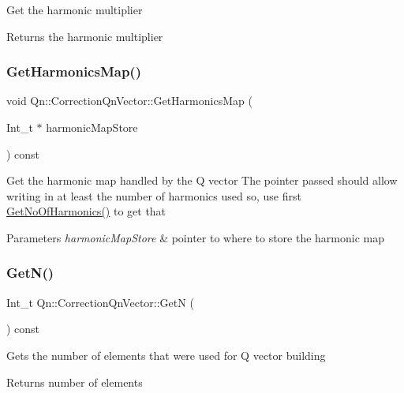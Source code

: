 Get the harmonic multiplier \begin{DoxyReturn}{Returns}
the harmonic multiplier 
\end{DoxyReturn}
\mbox{\label{classQn_1_1CorrectionQnVector_af41ace21d8328373d0496ea68e5a468c}} 
\subsubsection{\texorpdfstring{Get\+Harmonics\+Map()}{GetHarmonicsMap()}}
{\footnotesize\ttfamily void Qn\+::\+Correction\+Qn\+Vector\+::\+Get\+Harmonics\+Map (\begin{DoxyParamCaption}\item[{Int\+\_\+t $\ast$}]{harmonic\+Map\+Store }\end{DoxyParamCaption}) const}

Get the harmonic map handled by the Q vector The pointer passed should allow writing in at least the number of harmonics used so, use first \mbox{\hyperlink{classQn_1_1CorrectionQnVector_a4da8a1b6a2f12c2393ae86b5fa19b0ae}{Get\+No\+Of\+Harmonics()}} to get that


\begin{DoxyParams}{Parameters}
{\em harmonic\+Map\+Store} & pointer to where to store the harmonic map \\
\hline
\end{DoxyParams}
\mbox{\label{classQn_1_1CorrectionQnVector_ab182d3ac68a795f5732daa83ae2f7417}} 
\subsubsection{\texorpdfstring{Get\+N()}{GetN()}}
{\footnotesize\ttfamily Int\+\_\+t Qn\+::\+Correction\+Qn\+Vector\+::\+GetN (\begin{DoxyParamCaption}{ }\end{DoxyParamCaption}) const\hspace{0.3cm}{\ttfamily [inline]}}

Gets the number of elements that were used for Q vector building \begin{DoxyReturn}{Returns}
number of elements 
\end{DoxyReturn}
\mbox{\label{classQn_1_1CorrectionQnVector_a9b0c28b62017cc7a369b39bbbbc2301a}} 
